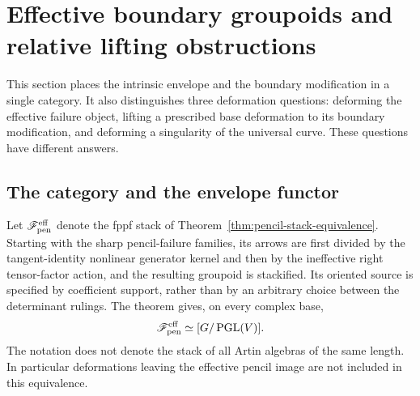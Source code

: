 \documentclass[11pt,reqno]{amsart}
\numberwithin{equation}{section}
\theoremstyle{definition}\newtheorem{definition}[theorem]{Definition}
\theoremstyle{remark}\newtheorem{remark}[theorem]{Remark}
\begin{document}
\section{Effective boundary groupoids and relative lifting obstructions}
\label{sec:effective-boundary-v161}
This section places the intrinsic envelope and the boundary modification
in a single category. It also distinguishes three deformation questions:
deforming the effective failure object, lifting a prescribed base
deformation to its boundary modification, and deforming a singularity
of the universal curve. These questions have different answers.

\subsection{The category and the envelope functor}
Let $\mathscr F_{\rm pen}^{\rm eff}$ denote the fppf stack of
Theorem~\ref{thm:pencil-stack-equivalence}. Starting with the sharp
pencil-failure families, its arrows are first divided by the
tangent-identity nonlinear generator kernel and then by the ineffective
right tensor-factor action, and the resulting groupoid is stackified.
Its oriented source is specified by coefficient support, rather than
by an arbitrary choice between the determinant rulings. The theorem
gives, on every complex base,
\begin{equation}\label{eq:effective-stack-v161}
       \mathscr F_{\rm pen}^{\rm eff}\simeq[G/\operatorname{PGL}(V)].
\end{equation}
The notation does not denote the stack of all Artin algebras of the
same length. In particular deformations leaving the effective
pencil image are not included in this equivalence.
\end{document}
